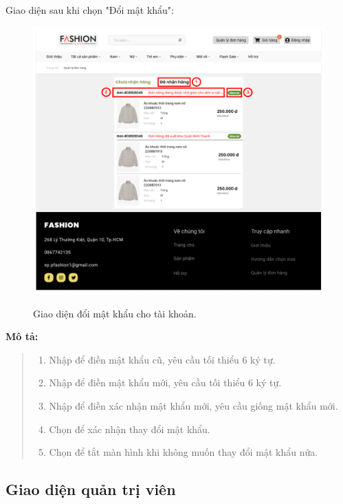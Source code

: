     \newpage
 
    Giao diện sau khi chọn "Đổi mật khẩu":
    \begin{figure}[!htp]
        \centering
        \includegraphics[width=5in]{img/UI/customer/customer_order.png}
        \label{16}
        \newline
        \caption{Giao diện đổi mật khẩu cho tài khoản.}
    \end{figure}
 
    \textbf{Mô tả:}  
    \begin{quote}
        \begin{enumerate}
            \item Nhập để điền mật khẩu cũ, yêu cầu tối thiểu 6 ký tự.
            \item Nhập để điền mật khẩu mới, yêu cầu tối thiểu 6 ký tự.
            \item Nhập để điền xác nhận mật khẩu mới, yêu cầu giống mật khẩu mới.
            \item Chọn để xác nhận thay đổi mật khẩu.
            \item Chọn để tắt màn hình khi không muốn thay đổi mật khẩu nữa.
        \end{enumerate}
    \end{quote}  
   
\newpage


\subsection{Giao diện quản trị viên}
